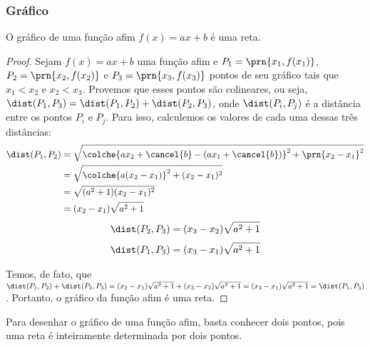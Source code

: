 \subsubsection{Gráfico}

\begin{proposition}
    O gráfico de uma função afim $f(x) = ax + b$ é uma reta.
\end{proposition}

\begin{proof}
    Sejam $f(x)=ax+b$ uma função afim e $P_1 = \prn{x_1, f(x_1)}$, $P_2 = \prn{x_2, f(x_2)}$
    e $P_3 = \prn{x_3, f(x_3)}$ pontos de seu gráfico tais que $x_1 < x_2$ e $x_2 < x_3$. 
    Provemos que esses pontos são colineares, ou seja, $\dist(P_1, P_3) = \dist(P_1, P_2) + \dist(P_2, P_3)$, onde $\dist (P_i, P_j)$ é a distância entre os pontos $P_i$ e $P_j$.
    Para isso, calculemos os valores de cada uma dessas três distâncias:
    \begin{align*}
        \dist(P_1, P_2) &= \sqrt{\colche{ax_2+\cancel{b}-(ax_1+\cancel{b})}^2 + \prn{x_2-x_1}^2} \\
        &= \sqrt{\colche{a(x_2-x_1)}^2+(x_2-x_1)^2} \\
        &= \sqrt{(a^2+1)(x_2-x_1)^2}\\
        &= (x_2-x_1)\sqrt{a^2+1}
    \end{align*}
    \begin{align*}
        \dist(P_2, P_3)=(x_3-x_2)\sqrt{a^2+1}
    \end{align*}
    \begin{align*}
        \dist(P_1,P_3)=(x_3-x_1)\sqrt{a^2+1}
    \end{align*}
    
    Temos, de fato, que $\dist(P_1, P_2) + \dist(P_2, P_3) = (x_2-x_1)\sqrt{a^2+1}+(x_3-x_2)\sqrt{a^2+1} = (x_3-x_1)\sqrt{a^2+1} 
    = \dist(P_1,P_3)$. Portanto, o gráfico da função afim é uma reta.
\end{proof}

\begin{remark}
Para desenhar o gráfico de uma função afim, basta conhecer dois pontos, 
pois uma reta é inteiramente determinada por dois pontos.
\end{remark}